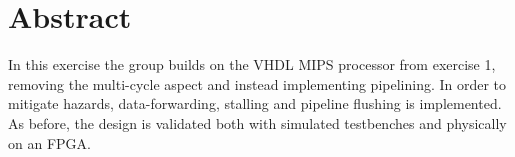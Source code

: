 \chapter*{Abstract}
In this exercise the group builds on the VHDL MIPS processor from exercise 1,
removing the multi-cycle aspect and instead implementing pipelining.
In order to mitigate hazards, data-forwarding, stalling and pipeline flushing is implemented.
As before, the design is validated both with simulated testbenches and physically on an FPGA.

